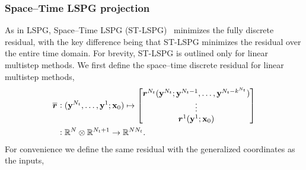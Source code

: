 \documentclass[3p,computermodern,10pt]{elsarticle}
\begin{document}
\subsubsection{Space--Time LSPG projection}  
As in LSPG, Space--Time LSPG (ST-LSPG)~\cite{choi_stlspg} minimizes the fully discrete residual, with the key difference being that ST-LSPG minimizes the residual over the entire time domain. For brevity, ST-LSPG is outlined only for linear multistep methods.
We first define the space--time discrete residual for linear multistep methods,
\begin{align*}
\overline{\boldsymbol r}_{} & \vcentcolon (\mathbf{y}^{N_t}, \ldots ,\mathbf{y}^{1};{{\mathbf{x}}_0}) \mapsto \begin{bmatrix}
\boldsymbol r_{}^{N_t}(\mathbf{y}^{N_t};\mathbf{y}^{N_t-1},\ldots,\mathbf{y}^{N_t - k^{N_t}}) \\ 
\vdots \\
\boldsymbol r_{}^{1}(\mathbf{y}^{1}; {{\mathbf{x}}_0}) 
\end{bmatrix}  \\
& \vcentcolon \mathbb{R}^{N} \otimes \mathbb{R}^{N_t+1} \rightarrow \mathbb{R}^{N N_t}. 
\end{align*}
For convenience we define the same residual with the generalized coordinates as the inputs,
\end{document}
